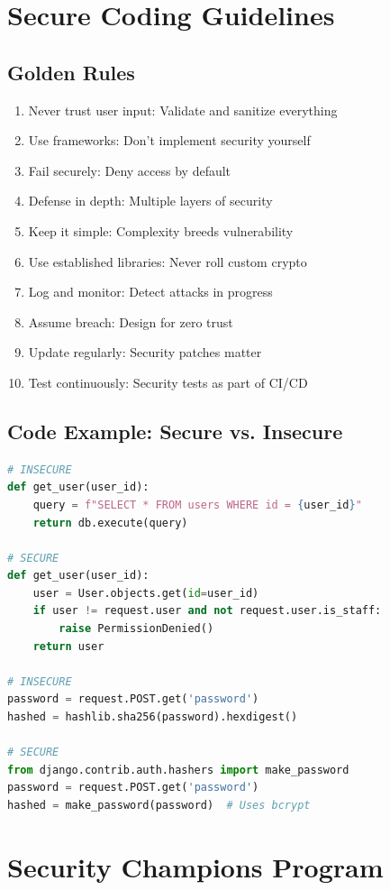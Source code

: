 \documentclass{report}
\begin{document}
\section{Secure Coding Guidelines}

\subsection{Golden Rules}
\begin{enumerate}
\item Never trust user input: Validate and sanitize everything
\item Use frameworks: Don't implement security yourself
\item Fail securely: Deny access by default
\item Defense in depth: Multiple layers of security
\item Keep it simple: Complexity breeds vulnerability
\item Use established libraries: Never roll custom crypto
\item Log and monitor: Detect attacks in progress
\item Assume breach: Design for zero trust
\item Update regularly: Security patches matter
\item Test continuously: Security tests as part of CI/CD
\end{enumerate}

\subsection{Code Example: Secure vs. Insecure}
\begin{lstlisting}[language=Python]
# INSECURE
def get_user(user_id):
    query = f"SELECT * FROM users WHERE id = {user_id}"
    return db.execute(query)

# SECURE
def get_user(user_id):
    user = User.objects.get(id=user_id)
    if user != request.user and not request.user.is_staff:
        raise PermissionDenied()
    return user

# INSECURE
password = request.POST.get('password')
hashed = hashlib.sha256(password).hexdigest()

# SECURE
from django.contrib.auth.hashers import make_password
password = request.POST.get('password')
hashed = make_password(password)  # Uses bcrypt
\end{lstlisting}

\section{Security Champions Program}
\end{document}
